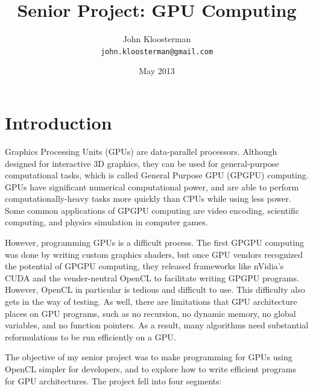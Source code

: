 \documentclass{article}
\begin{document}
\lstset{ 
  belowcaptionskip=1\baselineskip,
  xleftmargin=\parindent,
  basicstyle=\footnotesize\ttfamily,
  tabsize=4,
  breaklines=true
 }

\title{Senior Project: GPU Computing}
\author{John Kloosterman \\
  \texttt{john.kloosterman@gmail.com}}
\date{May 2013}
\maketitle


\section{Introduction}

Graphics Processing Units (GPUs) are data-parallel processors. Although designed for interactive 3D graphics, they can be used for general-purpose computational tasks, which is called General Purpose GPU (GPGPU) computing. GPUs have significant numerical computational power, and are able to perform computationally-heavy tasks more quickly than CPUs while using less power. Some common applications of GPGPU computing are video encoding, scientific computing, and physics simulation in computer games.

However, programming GPUs is a difficult process. The first GPGPU computing was done by writing custom graphics shaders, but once GPU vendors recognized the potential of GPGPU computing, they released frameworks like nVidia's CUDA and the vender-neutral OpenCL to facilitate writing GPGPU programs. However, OpenCL in particular is tedious and difficult to use. This difficulty also gets in the way of testing. As well, there are limitations that GPU architecture places on GPU programs, such as no recursion, no dynamic memory, no global variables, and no function pointers. As a result, many algorithms need substantial reformulations to be run efficiently on a GPU.

The objective of my senior project was to make programming for GPUs using OpenCL simpler for developers, and to explore how to write efficient programs for GPU architectures. The project fell into four segments:
\end{document}
